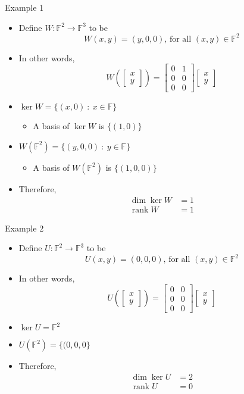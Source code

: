 \documentclass[usenames,dvipsnames,10pt]{beamer}
\newcommand\F{\mathbb{F}}
\newcommand\rank{\operatorname{rank}}
\begin{document}
\begin{frame}
  {Example 1}
  \begin{itemize}
  \item Define $W: \F^2 \rightarrow \F^3$ to be
    \[
      W(x,y) = (y,0,0)\text{, for all }(x,y) \in \F^2
    \]
  \item In other words,
    \[
      W\left(\begin{bmatrix} x \\ y \end{bmatrix}\right)
      =
      \begin{bmatrix} 0 & 1 \\ 0 & 0 \\ 0 & 0 \end{bmatrix}\begin{bmatrix} x \\ y \end{bmatrix}
    \]
  \item $\ker W = \{ (x,0)\ :\ x \in \F\}$
    \begin{itemize}
    \item A basis of $\ker W$ is $\{(1,0)\}$
    \end{itemize}
  \item $W(\F^2) = \{ (y,0,0)\ :\ y \in \F\}$
    \begin{itemize}
    \item A basis of $W(\F^2)$ is $\{(1,0,0)\}$
    \end{itemize}
  \item Therefore,
    \begin{align*}
      \dim \ker W &= 1\\
      \rank W &= 1
    \end{align*}
  \end{itemize}
\end{frame}

\begin{frame}
  {Example 2}
  \begin{itemize}
  \item Define $U: \F^2 \rightarrow \F^3$ to be
    \[
      U(x,y) = (0,0,0)\text{, for all }(x,y) \in \F^2
    \]
  \item In other words,
    \[
      U\left(\begin{bmatrix} x \\ y \end{bmatrix}\right)
      =
      \begin{bmatrix} 0 & 0 \\ 0 & 0 \\ 0 & 0 \end{bmatrix}\begin{bmatrix} x \\ y \end{bmatrix}
    \]
  \item $\ker U = \F^2$
  \item $U(\F^2) = \{ (0,0,0\}$
  \item Therefore,
    \begin{align*}
      \dim \ker U &= 2\\
      \rank U &= 0
    \end{align*}
  \end{itemize}
\end{frame}
\end{document}
